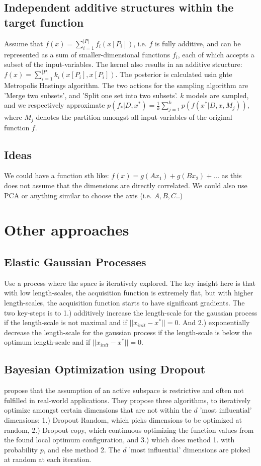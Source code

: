 \subsection{Independent additive structures within the target function}
\citep{Gardner2017} Assume that $f(x) = \sum_{i=1}^{ |P| } f_i (x[P_i] )$, i.e. $f$ is fully additive, and can be represented as a sum of smaller-dimensional functions $f_i$, each of which accepts a subset of the input-variables.
The kernel also results in an additive structure: $f(x) = \sum_{i=1}^{ |P| } k_i (x[P_i], x[P_i])$.
The posterior is calculated usin ghte Metropolis Hastings algorithm.
The two actions for the sampling algorithm are 'Merge two subsets', and 'Split one set into two subsets'.
$k$ models are sampled, and we respectively approximate $p(f_* | D, x^*) = \frac{1}{k} \sum_{j=1}^{k} p( f(x^* | D, x, M_j) )$, where $M_j$ denotes the partition amongst all input-variables of the original function $f$.

\subsection{Ideas}
We could have a function sth like:
$f(x) = g(Ax_1) + g(Bx_2) + ...$
as this does not assume that the dimensions are directly correlated.
We could also use PCA or anything similar to choose the axis (i.e. $A, B, C$..)


\section{Other approaches}

\subsection{Elastic Gaussian Processes}
\citep{Rana2017} Use a process where the space is iteratively explored.
The key insight here is that with low length-scales, the acquisition function is extremely flat, but with higher length-scales, the acquisition function starts to have significant gradients.
The two key-steps is to 1.) additively increase the length-scale for the gaussian process if the length-scale is not maximal and if $|| x_{init} - x^* || = 0$.
And 2.) exponentially decrease the length-scale for the gaussian process if the length-scale is below the optimum length-scale and if $|| x_{init} - x^* || = 0$.


\subsection{Bayesian Optimization using Dropout}
\citep{Li2018} propose that the assumption of an active subspace is restrictive and often not fulfilled in real-world applications.
They propose three algorithms, to iteratively optimize amongst certain dimensions that are not within the $d$ 'most influential' dimensions: 1.) Dropout Random, which picks dimensions to be optimized at random, 2.) Dropout copy, which continuous optimizing the function values from the found local optimum configuration, and 3.) which does method 1. with probability $p$, and else method 2.
The $d$ 'most influential' dimensions are picked at random at each iteration.


